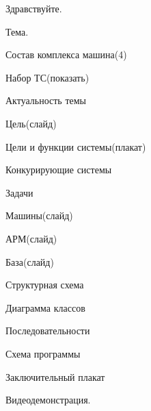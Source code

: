 




\begin{enum}
	\item Здравствуйте.
	\item Тема.
	\item Состав комплекса машина(4)
	\item Набор ТС(показать)
	\item Актуальность темы
	\item Цель(слайд)
	\item Цели и функции системы(плакат)
	\item Конкурирующие системы
	\item Задачи
	\item Машины(слайд)
	\item АРМ(слайд)
	\item База(слайд)
	\item Структурная схема
	\item Диаграмма классов
	\item Последовательности
	\item Схема программы
	\item Заключительный плакат
\end{enum}

Видеодемонстрация.


